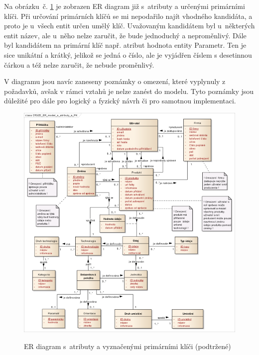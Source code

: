 \documentclass[11pt,a4paper]{article}
\begin{document}
Na obrázku~č. \ref{fig:DTOZE_konc_sA} je zobrazen ER diagram již s~atributy a určenými primárními klíči. Při určování primárních klíčů se mi nepodařilo najít vhodného kandidáta, a proto je u~všech entit určen umělý klíč. Uvažovaným kandidátem byl u~některých entit název, ale u~něho nelze zaručit, že bude jednoduchý a neproměnlivý. Dále byl kandidátem na primární klíč např. atribut hodnota entity Parametr. Ten je sice unikátní a krátký, jelikož se jedná o číslo, ale je vyjádřen číslem s desetinnou čárkou a též nelze zaručit, že nebude proměnlivý.  

V diagramu jsou navíc zaneseny poznámky o omezení, které vyplynuly z požadavků, avšak v rámci vztahů je nelze zanést do modelu. Tyto poznámky jsou důležité pro dále pro logický a fyzický návrh či pro samotnou implementaci.

\begin{figure}[H] 
\centering 
\caption{ER diagram s~atributy a vyznačenými primárními klíči (podtržené)} 
\vspace{0.1cm}
\includegraphics[scale=0.75]{DTOZE_konc_sA_n} 
\label{fig:DTOZE_konc_sA}
\end{figure} 
\end{document}
